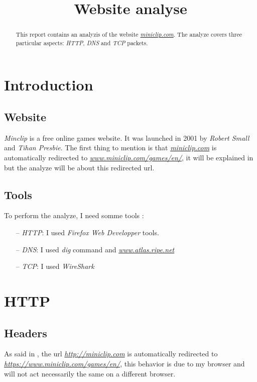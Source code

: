 \documentclass{article}
\title{Website analyse}
\newcommand{\link}[1]{\href{#1}{\textit{#1}}}
\begin{document}
%
\maketitle
%
\begin{abstract}
This report contains an analyzis of the website \link{miniclip.com}. The analyze covers three particular aspects: \textit{HTTP}, \textit{DNS} and \textit{TCP} packets.
\end{abstract}
%
%
\section{Introduction}
\label{sec:intro}
\subsection{Website}
\label{sub:web}
\textit{Minclip} is a free online games website. It was launched in 2001 by \textit{Robert Small} and \textit{Tihan Presbie}. The first thing to mention is that \link{miniclip.com} is automatically redirected to \link{www.miniclip.com/games/en/}, it will be explained in \textbf{} but the analyze will be about this redirected url.
\subsection{Tools}
\label{sub:tools}
To perform the analyze, I need somme tools :
\begin{itemize}
    \item[--] \textit{HTTP}: I used \textit{Firefox Web Developper} tools.
    \item[--] \textit{DNS}: I used \textit{dig} command and \link{www.atlas.ripe.net}
    \item[--] \textit{TCP}: I used \textit{WireShark}
\end{itemize}

\section{HTTP}
\label{sec:HTTP}

\subsection{Headers}
\label{sub:headers}

As said in , the url \link{http://miniclip.com} is automatically redirected to \link{https://www.miniclip.com/games/en/}, this behavior is due to my browser and will not act necessarily the same on a different browser. 
\end{document}

